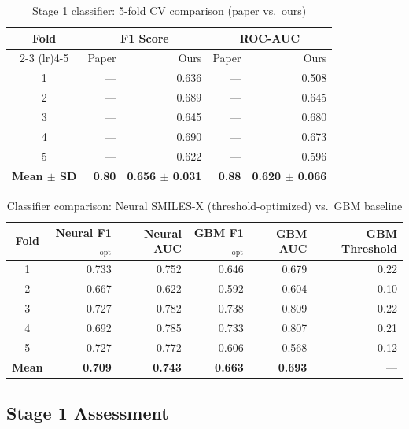 \documentclass[11pt]{article}
\begin{document}
\begin{table}[H]
\centering
\caption{Stage 1 classifier: 5-fold CV comparison (paper vs.\ ours)}
\label{tab:stage1}
\begin{tabular}{@{}crrrr@{}}
\toprule
\textbf{Fold} & \multicolumn{2}{c}{\textbf{F1 Score}} & \multicolumn{2}{c}{\textbf{ROC-AUC}} \\
\cmidrule(lr){2-3} \cmidrule(lr){4-5}
 & \textcolor{paperblue}{Paper} & \textcolor{oursred}{Ours} & \textcolor{paperblue}{Paper} & \textcolor{oursred}{Ours} \\
\midrule
1 & --- & 0.636 & --- & 0.508 \\
2 & --- & 0.689 & --- & 0.645 \\
3 & --- & 0.645 & --- & 0.680 \\
4 & --- & 0.690 & --- & 0.673 \\
5 & --- & 0.622 & --- & 0.596 \\
\midrule
\textbf{Mean $\pm$ SD} & \textcolor{paperblue}{\textbf{0.80}} & \textcolor{oursred}{\textbf{0.656 $\pm$ 0.031}} & \textcolor{paperblue}{\textbf{0.88}} & \textcolor{oursred}{\textbf{0.620 $\pm$ 0.066}} \\
\bottomrule
\end{tabular}
\end{table}

\begin{table}[H]
\centering
\caption{Classifier comparison: Neural SMILES-X (threshold-optimized) vs.\ GBM baseline}
\label{tab:clf_compare}
\small
\begin{tabular}{@{}crrrrr@{}}
\toprule
\textbf{Fold} & \textbf{Neural F1$_\mathrm{opt}$} & \textbf{Neural AUC} & \textbf{GBM F1$_\mathrm{opt}$} & \textbf{GBM AUC} & \textbf{GBM Threshold} \\
\midrule
1 & 0.733 & 0.752 & 0.646 & 0.679 & 0.22 \\
2 & 0.667 & 0.622 & 0.592 & 0.604 & 0.10 \\
3 & 0.727 & 0.782 & 0.738 & 0.809 & 0.22 \\
4 & 0.692 & 0.785 & 0.733 & 0.807 & 0.21 \\
5 & 0.727 & 0.772 & 0.606 & 0.568 & 0.12 \\
\midrule
\textbf{Mean} & \textbf{0.709} & \textbf{0.743} & \textbf{0.663} & \textbf{0.693} & --- \\
\bottomrule
\end{tabular}
\end{table}

\subsection{Stage 1 Assessment}
\end{document}
